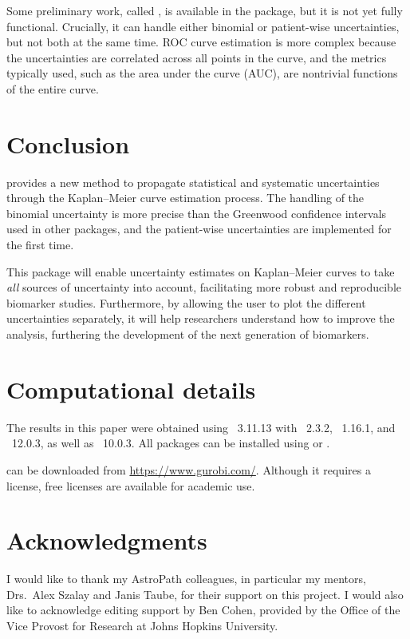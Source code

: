 \documentclass[article]{jss}
\newcommand{\KM}{Kaplan--Meier} %
\begin{document}
Some preliminary work, called , is available in the  package, but it is not yet fully functional. Crucially, it can handle either binomial or patient-wise uncertainties, but not both at the same time. ROC curve estimation is more complex because the uncertainties are correlated across all points in the curve, and the metrics typically used, such as the area under the curve (AUC), are nontrivial functions of the entire curve.

\section{Conclusion}

 provides a new method to propagate statistical and systematic uncertainties through the \KM{} curve estimation process. The handling of the binomial uncertainty is more precise than the Greenwood confidence intervals used in other packages, and the patient-wise uncertainties are implemented for the first time.

This package will enable uncertainty estimates on \KM{} curves to take \emph{all} sources of uncertainty into account, facilitating more robust and reproducible biomarker studies. Furthermore, by allowing the user to plot the different uncertainties separately, it will help researchers understand how to improve the analysis, furthering the development of the next generation of biomarkers.

\section*{Computational details}

The results in this paper were obtained using ~3.11.13 with ~2.3.2, ~1.16.1, and ~12.0.3, as well as ~10.0.3. All  packages can be installed using  or .

 can be downloaded from \url{https://www.gurobi.com/}. Although it requires a license, free licenses are available for academic use.

\section*{Acknowledgments}

I would like to thank my AstroPath colleagues, in particular my mentors, Drs.~Alex Szalay and Janis Taube, for their support on this project. I would also like to acknowledge editing support by Ben Cohen, provided by the Office of the Vice Provost for Research at Johns Hopkins University.
\end{document}
